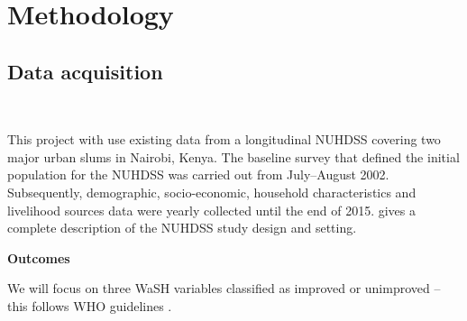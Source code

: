 \section{Methodology}

\subsection{Data acquisition}

~

This project with use existing data from a longitudinal NUHDSS covering two major urban slums in Nairobi, Kenya. The baseline survey that defined the initial population for the NUHDSS was carried out from July–August 2002. Subsequently, demographic, socio-economic, household characteristics  and livelihood sources data were yearly collected until the end of 2015. \citet{beguy2015health} gives a complete description of the NUHDSS study design and setting.

\textbf{Outcomes}

We will focus on three WaSH variables classified as improved or unimproved -- this follows WHO guidelines \citep{journal.pone.0151645}.

